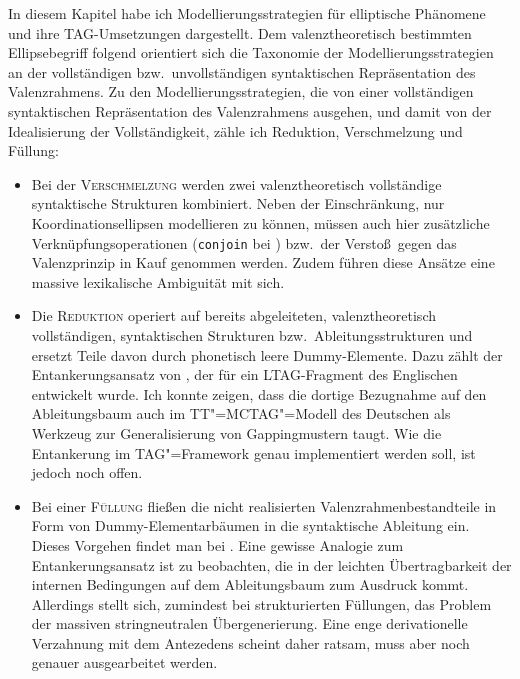 In diesem Kapitel habe ich Modellierungsstrategien für elliptische Phänomene und ihre TAG-Umsetzungen dargestellt. Dem valenztheoretisch bestimmten Ellipsebegriff folgend orientiert sich die Taxonomie der Modellierungsstrategien an der vollständigen bzw.\ unvollständigen syntaktischen Repräsentation des Valenzrahmens. %
Zu den Modellierungsstrategien, die von einer vollständigen syntaktischen Repräsentation des Valenzrahmens ausgehen, und damit von der Idealisierung der Vollständigkeit, zähle ich Reduktion, Verschmelzung und Füllung:
\begin{itemize}
  \item Bei der \textsc{Verschmelzung} werden zwei valenztheoretisch vollständige syntaktische Strukturen kombiniert. Neben der Einschränkung, nur Koordinationsellipsen modellieren zu können, müssen auch hier zusätzliche Verknüpfungsoperationen ({\tt conjoin} bei \citealt{Sarkar:Joshi:96,Sarkar:Joshi:97}) bzw.\ der Versto\ss\ gegen das Valenzprinzip \citep{Seddah:08,Seddah:etal:10} in Kauf genommen werden. Zudem führen diese Ansätze eine massive lexikalische Ambiguität mit sich.  
  \item Die \textsc{Reduktion} operiert auf bereits abgeleiteten, valenztheoretisch vollständigen, syntaktischen Strukturen bzw.\ Ableitungsstrukturen und ersetzt Teile davon durch phonetisch leere Dummy-Elemente. Dazu zählt der Entankerungsansatz von \cite{Lichte:Kallmeyer:10}, der für ein LTAG-Fragment des Englischen entwickelt wurde. Ich konnte zeigen, dass die dortige Bezugnahme auf den Ableitungsbaum auch im TT"=MCTAG"=Modell des Deutschen als Werkzeug zur Generalisierung von Gappingmustern taugt. Wie die Entankerung im TAG"=Framework genau implementiert werden soll, ist jedoch noch offen.
  \item Bei einer \textsc{Füllung} flie\ss en die nicht realisierten Valenzrahmenbestandteile in Form von Dummy-Elementarbäumen in die syntaktische Ableitung ein. Dieses Vorgehen findet man bei \cite{Seddah:Sagot:06}. Eine gewisse Analogie zum Entankerungsansatz ist zu beobachten, die in der leichten Übertragbarkeit der internen Bedingungen auf dem Ableitungsbaum zum Ausdruck kommt. Allerdings stellt sich, zumindest bei strukturierten Füllungen, das Problem der massiven stringneutralen Übergenerierung. Eine enge derivationelle Verzahnung mit dem Antezedens scheint daher ratsam, muss aber noch genauer ausgearbeitet werden. 
\end{itemize}
